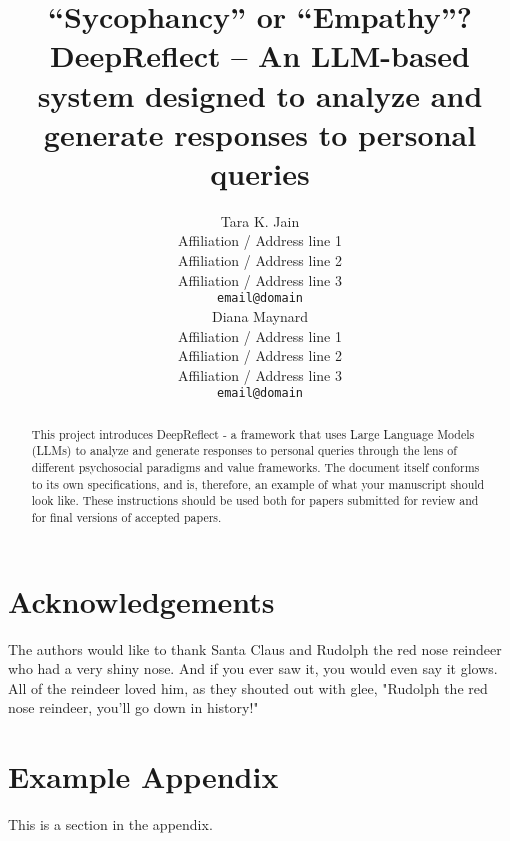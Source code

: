 \documentclass[11pt]{article}
\title{“Sycophancy” or “Empathy”? \\
DeepReflect – An LLM-based system designed to analyze and generate responses to personal queries 
}
\author{Tara K. Jain \\
  Affiliation / Address line 1 \\
  Affiliation / Address line 2 \\
  Affiliation / Address line 3 \\
  \texttt{email@domain} \\\And
  Diana Maynard \\
  Affiliation / Address line 1 \\
  Affiliation / Address line 2 \\
  Affiliation / Address line 3 \\
  \texttt{email@domain} \\}
\begin{document}
\maketitle
\begin{abstract}
\textcolor{black!30}{This project introduces DeepReflect - a framework that uses Large Language Models (LLMs) to analyze and generate responses to personal queries through the lens of different psychosocial paradigms and value frameworks. The document itself conforms to its own specifications, and is, therefore, an example of what your manuscript should look like.
These instructions should be used both for papers submitted for review and for final versions of accepted papers.}
\end{abstract} 










\section*{Acknowledgements}
The authors would like to thank Santa Claus and Rudolph the red nose reindeer who had a very shiny nose. And if you ever saw it, you would even say it glows. All of the reindeer loved him, as they shouted out with glee, "Rudolph the red nose reindeer, you'll go down in history!"



\appendix

\section{Example Appendix}
\label{sec:appendix}

This is a section in the appendix.
\end{document}

